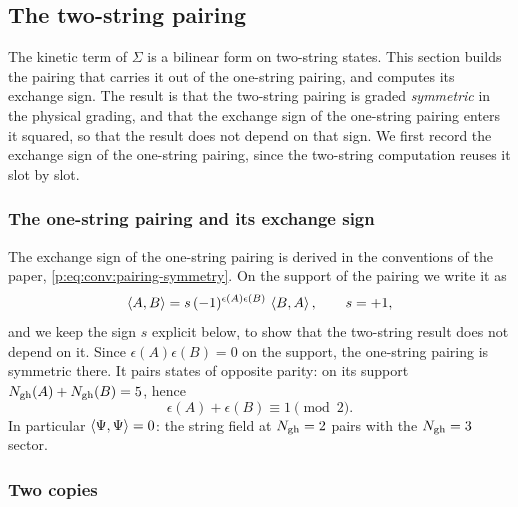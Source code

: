 \subsection{The two-string pairing}
\label{pg:sec:pairing}

The kinetic term of $\Sigma$ is a bilinear form on two-string states.
This section builds the pairing that carries it out of the one-string pairing, and computes its exchange sign.
The result is that the two-string pairing is graded \emph{symmetric} in the physical grading, and that the exchange sign of the one-string pairing enters it squared, so that the result does not depend on that sign.
We first record the exchange sign of the one-string pairing, since the two-string computation reuses it slot by slot.

\subsubsection{The one-string pairing and its exchange sign}
\label{pg:sec:pairing:one}

The exchange sign of the one-string pairing is derived in the conventions of the paper, \eqref{p:eq:conv:pairing-symmetry}.
On the support of the pairing we write it as
\begin{equation}
  \label{pg:eq:pairing:one-antisym}
  \braket{A, B}
    = s \, (-1)^{\epsilon(A) \epsilon(B)} \, \braket{B, A},
  \qquad
  s
    = + 1,
\end{equation}
and we keep the sign $s$ explicit below, to show that the two-string result does not depend on it.
Since $\epsilon(A) \epsilon(B) = 0$ on the support, the one-string pairing is symmetric there.
It pairs states of opposite parity: on its support $N_{\rm gh}(A)+N_{\rm gh}(B)=5$, hence
\begin{equation}
  \label{pg:eq:pairing:one-support}
  \epsilon(A) + \epsilon(B)
    \equiv 1 \pmod 2 .
\end{equation}
In particular $\braket{\Psi,\Psi}=0$: the string field at $N_{\rm gh}=2$ pairs with the $N_{\rm gh}=3$ sector.

\subsubsection{Two copies}
\label{pg:sec:pairing:two}

